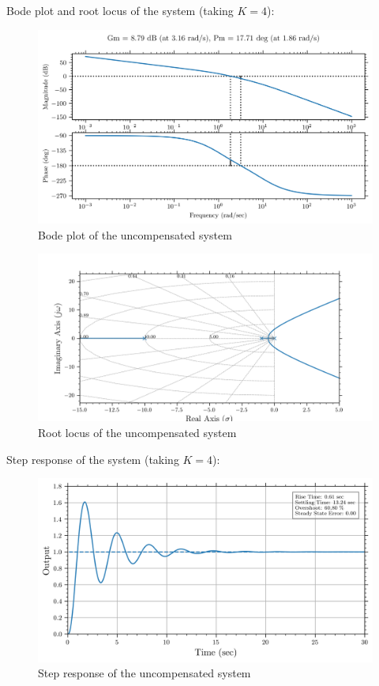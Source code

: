\documentclass[12pt]{article}
\begin{document}
Bode plot and root locus of the system (taking $K=4$):
\begin{figure}[h!]
    \centering
    \includegraphics[width=0.8\linewidth]{bode_uncompensated.png}
    \caption {Bode plot of the uncompensated system}
    \label{fig:bode_uncompensated}
\end{figure}

\begin{figure}[h!]
    \centering
    \includegraphics[width=0.8\linewidth]{rootlocus_uncompensated.png}
    \caption {Root locus of the uncompensated system}
    \label{fig:root_locus_uncompensated}
\end{figure}

\clearpage

Step response of the system (taking $K=4$):
\begin{figure}[h!]
    \centering
    \includegraphics[width=0.8\linewidth]{step_response_uncompensated.png}
    \caption {Step response of the uncompensated system}
    \label{fig:step_uncompensated}
\end{figure}
\end{document}

